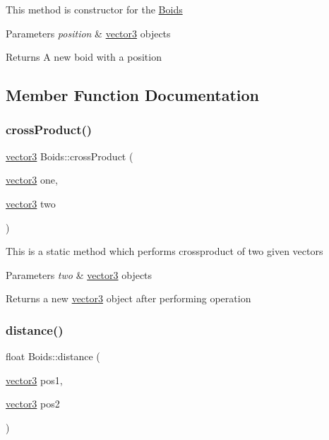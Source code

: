 This method is constructor for the \mbox{\hyperlink{class_boids}{Boids}} 
\begin{DoxyParams}{Parameters}
{\em position} & \mbox{\hyperlink{structvector3}{vector3}} objects \\
\hline
\end{DoxyParams}
\begin{DoxyReturn}{Returns}
A new boid with a position 
\end{DoxyReturn}


\subsection{Member Function Documentation}
\mbox{\label{class_boids_ae3185ab2d518aaf9ddd2133736ff8475}} 
\subsubsection{\texorpdfstring{cross\+Product()}{crossProduct()}}
{\footnotesize\ttfamily \mbox{\hyperlink{structvector3}{vector3}} Boids\+::cross\+Product (\begin{DoxyParamCaption}\item[{\mbox{\hyperlink{structvector3}{vector3}}}]{one,  }\item[{\mbox{\hyperlink{structvector3}{vector3}}}]{two }\end{DoxyParamCaption})\hspace{0.3cm}{\ttfamily [static]}}

This is a static method which performs crossproduct of two given vectors 
\begin{DoxyParams}{Parameters}
{\em two} & \mbox{\hyperlink{structvector3}{vector3}} objects \\
\hline
\end{DoxyParams}
\begin{DoxyReturn}{Returns}
a new \mbox{\hyperlink{structvector3}{vector3}} object after performing operation 
\end{DoxyReturn}
\mbox{\label{class_boids_ac845eeac48654504d6fc4da90e680d88}} 
\subsubsection{\texorpdfstring{distance()}{distance()}}
{\footnotesize\ttfamily float Boids\+::distance (\begin{DoxyParamCaption}\item[{\mbox{\hyperlink{structvector3}{vector3}}}]{pos1,  }\item[{\mbox{\hyperlink{structvector3}{vector3}}}]{pos2 }\end{DoxyParamCaption})\hspace{0.3cm}{\ttfamily [static]}}

